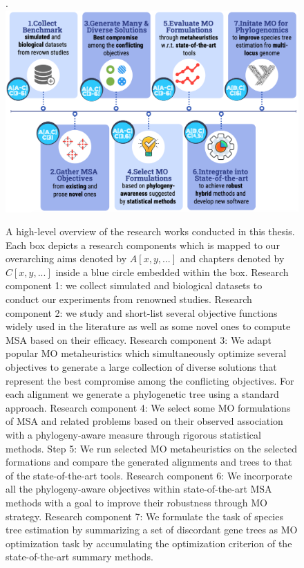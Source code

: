 \begin{figure}[!htbp]
	\centering
.	\includegraphics[width=1.0\textwidth]{Figure/research-overview-new}
	\caption[A high-level overview of the research works conducted in this thesis]{A high-level overview of the research works conducted in this thesis. Each box depicts a research components which is mapped to our overarching aims denoted by $A[x,y,...]$ and chapters denoted by $C[x,y,...]$ inside a blue circle embedded within the box.
		Research component 1: we collect simulated and biological datasets to conduct our experiments from renowned studies.
		Research component 2: we study and short-list several objective functions widely used in the literature as well as some novel ones to compute MSA based on their efficacy.
		Research component 3: We adapt popular MO metaheuristics which simultaneously optimize several objectives to generate a large collection of diverse solutions that represent the best compromise among the conflicting objectives. For each alignment we generate a phylogenetic tree using a standard approach.
		Research component 4: We select some MO formulations of MSA and related problems based on their observed association with a phylogeny-aware measure through rigorous statistical methods.
		Step 5: We run selected  MO metaheuristics on the selected formations and compare the generated alignments and trees to that of the state-of-the-art tools.
		Research component 6: We incorporate all the phylogeny-aware objectives within state-of-the-art MSA methods with a goal to improve their robustness through MO strategy.
		Research component 7: We formulate the task of species tree estimation by summarizing a set of discordant gene trees as MO optimization task by accumulating the optimization criterion of the state-of-the-art summary methods.}
	
	\label{fig:research-workflow}
	
\end{figure}

